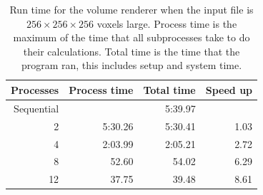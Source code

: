 \documentclass[a4paper]{article}
\begin{document}
\begin{table}[h]
	\centering
	\caption{Run time for the volume renderer when the input file is $256 \times 256 \times 256$ voxels large. Process time is the maximum of the time that all subprocesses take to do their calculations. Total time is the time that the program ran, this includes setup and system time.}
	\label{tbl:render2}
	\begin{tabular}{r|r|r|r}
		Processes & Process time & Total time & Speed up \\ \hline
		Sequential & & 5:39.97 & \\
		 2 & 5:30.26 & 5:30.41 & 1.03 \\
		 4 & 2:03.99 & 2:05.21 & 2.72 \\
		 8 &   52.60 &   54.02 & 6.29 \\
		12 &   37.75 &   39.48 & 8.61
	\end{tabular}
\end{table}
\end{document}
